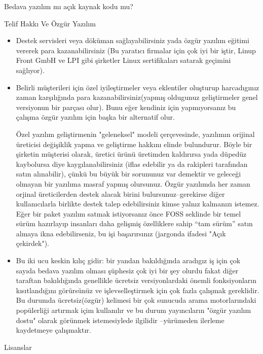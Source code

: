 \documentclass[10pt,a5paper]{book}
\begin{document}
\begin{section}{Bedava yazılım mı açık kaynak kodu mu?}
\begin{subsection}{Telif Hakkı Ve Özgür Yazılım}
\begin{itemize}
 \item Destek servisleri veya döküman sağlayabilirsiniz yada özgür yazılım eğitimi vererek para kazanabilirsiniz (Bu yaratıcı firmalar için çok iyi bir iştir, Linup Front GmbH ve LPI gibi şirketler Linux sertifikaları satarak geçimini sağlıyor).
 \item Belirli müşterileri için özel iyileştirmeler veya eklentiler oluşturup harcadıgınız zaman karşılığında para kazanabilirsiniz(yapmış oldugunuz geliştirmeler genel versiyonun bir parçası olur). Bunu eğer kendiniz için yapmıyorsanız bu çalışma özgür yazılım için başka bir alternatif olur.

Özel yazılım geliştirmenin "geleneksel" modeli çerçevesinde, yazılımın orijinal üreticisi değişiklik yapma ve geliştirme hakkını elinde bulundurur. Böyle bir şirketin müşterisi olarak, üretici ürünü üretimden kaldırırsa yada düpedüz kaybolursa diye kaygılanabilirsiniz (iflas edebilir ya da rakipleri tarafından satın alınabilir), çünkü bu büyük bir sorununuz var demektir ve geleceği olmayan bir yazılıma masraf yapmış olursunuz. Özgür yazılımda her zaman orjinal üreticilerden destek alacak birini bulursunuz--gerekirse diğer kullanıcılarla birlikte destek talep edebilirsiniz kimse yalnız kalmanızı istemez. Eğer bir paket yazılım satmak istiyorsanız önce FOSS seklinde bir temel sürüm hazırlayıp  insanları  daha gelişmiş özelliklere sahip “tam sürüm” satın almaya ikna edebilirseniz, bu işi başarırsınız (jargonda ifadesi "Açık çekirdek").

 \item Bu iki ucu keskin kılıç gidir: bir yandan bakıldığında aradıgız iş için çok sayıda bedava yazılım olması şüphesiz çok iyi bir şey olurdu fakat diğer taraftan bakıldığında genellikle ücretsiz versiyonlardaki önemli fonksiyonların kısıtlandığını görürsünüz ve işlevselleştirmek için çok fazla çalışmak gereklidir. Bu durumda ücretsiz(özgür) kelimesi bir çok sunucuda arama motorlarındaki popülerliği artırmak içim kullanılır ve bu durum yayıncıların "özgür yazılım dostu" olarak görünmek istemesiylede ilgilidir --yürümeden ilerleme kaydetmeye çalışmaktır.
 \end{itemize}
\end{subsection}
\begin{subsection}{Lisanslar}


\end{subsection}
\end{section}
\end{document}
